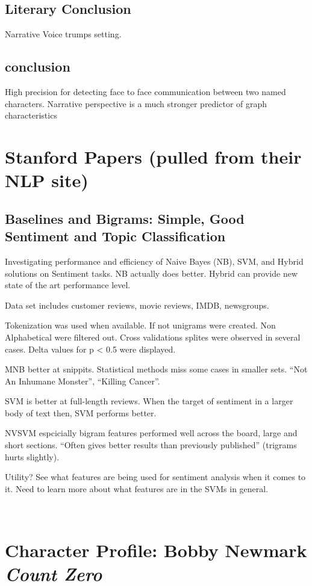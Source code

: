 \documentclass{report}\usepackage[]{graphicx}\usepackage[]{color}
\begin{document}
{\subsection{Literary Conclusion}

Narrative Voice trumps setting.

\subsection{conclusion}

High precision for detecting face to face communication between two
named characters. Narrative perspective is a much stronger predictor of
graph characteristics
\section{Stanford Papers (pulled from their NLP site)}

\subsection{Baselines and Bigrams: Simple, Good Sentiment and Topic Classification}
\date{January 30, 2014}

Investigating performance and efficiency of Naive Bayes (NB), SVM, and Hybrid solutions on Sentiment tasks. NB actually does better. Hybrid can provide new state of the art performance level.

Data set includes customer reviews, movie reviews, IMDB, newsgroups.

Tokenization was used when available. If not unigrams were created. Non Alphabetical were filtered out. Cross validations splites were observed in several cases. Delta values for p < 0.5 were displayed. 

MNB better at snippits. Statistical methods miss some cases in smaller sets. ``Not An Inhumane Monster'', ``Killing Cancer''.  

SVM is better at full-length reviews. When the target of sentiment in a larger body of text then, SVM performs better.

NVSVM espcicially bigram features performed well across the board, large and short sections. ``Often gives better results than previously published'' (trigrams hurts slightly). 

Utility? See what features are being used for sentiment analysis when it comes to it. Need to learn more about what features are in the SVMs in general.

\
\section{Character Profile: Bobby Newmark \textit{Count Zero}}
\date{February 2, 2014}

}
\end{document}
